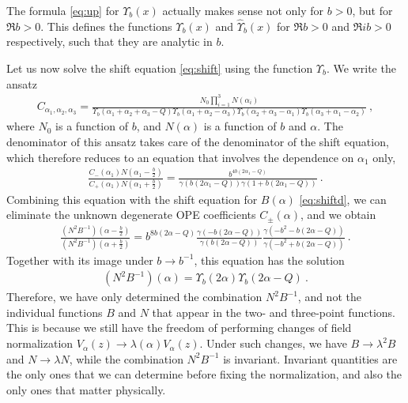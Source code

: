 \documentclass[12pt, a4paper]{article}
\theoremstyle{break}
\begin{document}
The formula \eqref{eq:up} for $\Upsilon_b(x)$ actually makes sense not only for $b>0$, but for $\Re b>0$. This defines the functions $\Upsilon_b(x)$ and $\hat\Upsilon_b(x)$  for $\Re b>0$ and $\Re ib>0$ respectively, such that they are analytic in $b$. 

Let us now solve the shift equation \eqref{eq:shift} using the function $\Upsilon_b$. We write the ansatz
\begin{align}
 C_{\alpha_1,\alpha_2,\alpha_3} =  \frac{N_0 \prod_{i=1}^3 N(\alpha_i)}{\Upsilon_b(\alpha_1+\alpha_2+\alpha_3-Q) \Upsilon_b(\alpha_1+\alpha_2-\alpha_3)\Upsilon_b(\alpha_2+\alpha_3-\alpha_1)\Upsilon_b(\alpha_3+\alpha_1-\alpha_2)} \ ,
\end{align}
where $N_0$ is a function of $b$, and $N(\alpha)$ is a function of $b$ and $\alpha$. 
The denominator of this ansatz takes care of the denominator of the shift equation, which therefore reduces to an equation that involves the dependence on $\alpha_1$ only, 
\begin{align}
 \frac{C_-(\alpha_1)N(\alpha_1-\frac{b}{2})}{C_+(\alpha_1)N(\alpha_1+\frac{b}{2})} = \frac{b^{4b(2\alpha_1-Q)}}{ \gamma(b(2\alpha_1-Q)) \gamma(1+b(2\alpha_1-Q))}\ .
\end{align}
Combining this equation with the shift equation for $B(\alpha)$ \eqref{eq:shiftd}, we can eliminate the unknown degenerate OPE coefficients $C_\pm(\alpha)$, and we obtain
\begin{align}
 \frac{\left(N^2B^{-1}\right)(\alpha-\frac{b}{2})}{\left(N^2B^{-1}\right)(\alpha+\frac{b}{2})} = b^{8b(2\alpha-Q)} \frac{\gamma(-b(2\alpha-Q))}{\gamma(b(2\alpha-Q))} \frac{\gamma(-b^2-b(2\alpha-Q))}{\gamma(-b^2+b(2\alpha-Q))}\ .
\end{align}
Together with its image under $b\to b^{-1}$, this equation has the solution
\begin{align}
 \left(N^2B^{-1}\right)(\alpha) = \Upsilon_b(2\alpha)\Upsilon_b(2\alpha-Q)\ .
 \label{eq:ntbm}
\end{align}
Therefore, we have only determined the combination $N^2B^{-1}$, and not the individual functions $B$ and $N$ that appear in the 
two- and three-point functions. This is because we still have the freedom of performing changes of field normalization $V_\alpha(z) \to \lambda(\alpha)V_\alpha(z)$. Under such changes, we have $B\to \lambda^2B$ and $N\to \lambda N$, while
the combination $N^2B^{-1}$ is invariant. Invariant quantities are the only ones that we can determine before fixing the normalization, and also the only ones that matter physically.
\end{document}
